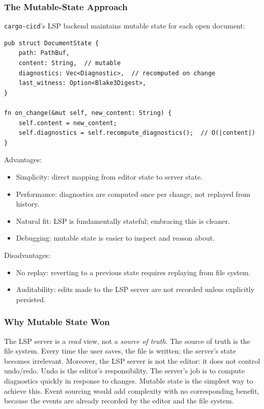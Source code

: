 \subsubsection{The Mutable-State Approach}

\texttt{cargo-cicd}'s LSP backend maintains mutable state for each open document:

\begin{lstlisting}[caption={Mutable-state LSP backend}]
pub struct DocumentState {
    path: PathBuf,
    content: String,  // mutable
    diagnostics: Vec<Diagnostic>,  // recomputed on change
    last_witness: Option<Blake3Digest>,
}

fn on_change(&mut self, new_content: String) {
    self.content = new_content;
    self.diagnostics = self.recompute_diagnostics();  // O(|content|)
}
\end{lstlisting}

Advantages:
\begin{itemize}
  \item Simplicity: direct mapping from editor state to server state.
  \item Performance: diagnostics are computed once per change, not replayed from history.
  \item Natural fit: LSP is fundamentally stateful; embracing this is cleaner.
  \item Debugging: mutable state is easier to inspect and reason about.
\end{itemize}

Disadvantages:
\begin{itemize}
  \item No replay: reverting to a previous state requires replaying from file system.
  \item Auditability: edits made to the LSP server are not recorded unless explicitly persisted.
\end{itemize}

\subsubsection{Why Mutable State Won}

The LSP server is a \emph{read} view, not a \emph{source of truth}. The source of truth is the file system. Every time the user saves, the file is written; the server's state becomes irrelevant. Moreover, the LSP server is not the editor: it does not control undo/redo. Undo is the editor's responsibility. The server's job is to compute diagnostics quickly in response to changes. Mutable state is the simplest way to achieve this. Event sourcing would add complexity with no corresponding benefit, because the events are already recorded by the editor and the file system.

